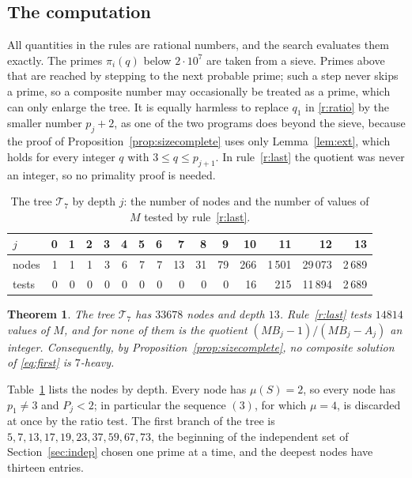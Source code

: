 \documentclass[screen,reqno]{aomart}
\numberwithin{equation}{section}
\theoremstyle{plain}
\newtheorem{theorem}{Theorem}[section]
\theoremstyle{definition}
\theoremstyle{remark}
\begin{document}
\subsection{The computation}\label{sec:sizecomp}
All quantities in the rules are rational numbers, and the search
evaluates them exactly. The primes $\pi_i(q)$ below $2\cdot10^7$ are
taken from a sieve. Primes above that are reached by stepping to the
next probable prime; such a step never skips a prime, so a composite
number may occasionally be treated as a prime, which can only enlarge
the tree. It is equally harmless to replace $q_1$ in \ref{r:ratio} by
the smaller number $p_j+2$, as one of the two programs does beyond
the sieve, because the proof of
Proposition~\ref{prop:sizecomplete} uses only Lemma~\ref{lem:ext},
which holds for every integer $q$ with $3\le q\le p_{j+1}$. In
rule~\ref{r:last} the quotient was never an integer, so no primality
proof is needed.

\begin{table}[ht]
\centering
\caption{The tree $\mathcal T_7$ by depth $j$: the number of nodes and
the number of values of $M$ tested by rule~\ref{r:last}.}
\label{tab:heavy}
\smallskip
\small
\begin{tabular}{@{}l*{14}{r}@{}}
\toprule
$j$ & 0 & 1 & 2 & 3 & 4 & 5 & 6 & 7 & 8 & 9 & 10 & 11 & 12 & 13\\
\midrule
nodes & 1 & 1 & 1 & 3 & 6 & 7 & 7 & 13 & 31 & 79 & 266 & 1\,501 & 29\,073 & 2\,689\\
tests & 0 & 0 & 0 & 0 & 0 & 0 & 0 & 0 & 0 & 0 & 16 & 215 & 11\,894 & 2\,689\\
\bottomrule
\end{tabular}
\end{table}

\begin{theorem}\label{thm:sizesearch}
The tree $\mathcal T_7$ has $33678$ nodes and depth $13$.
Rule~\ref{r:last} tests $14814$ values of $M$, and for none of them is
the quotient $(MB_j-1)/(MB_j-A_j)$ an integer. Consequently, by
Proposition~\ref{prop:sizecomplete}, no composite solution of
\eqref{eq:first} is $7$-heavy.
\end{theorem}

Table~\ref{tab:heavy} lists the nodes by depth. Every node has
$\mu(S)=2$, so every node has $p_1\ne3$ and $P_j<2$; in particular
the sequence $(3)$, for which $\mu=4$, is discarded at once by the
ratio test. The first branch of the tree is
$5,7,13,17,19,23,37,59,67,73$, the beginning of the independent set
of Section~\ref{sec:indep} chosen one prime at a time, and the deepest
nodes have thirteen entries.
\end{document}
